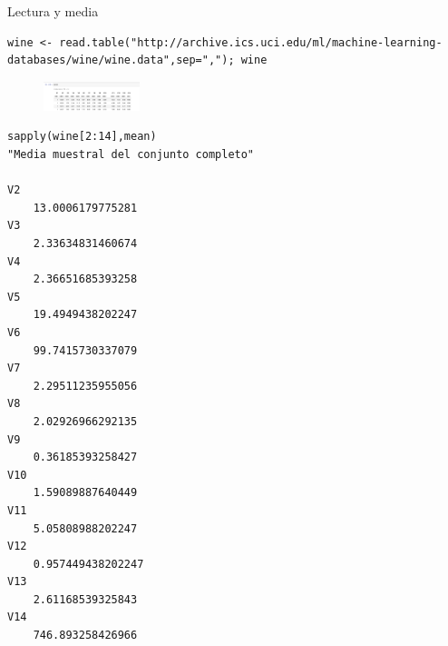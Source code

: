 \documentclass[xcolor=table]{beamer}
\begin{document}
\begin{frame}{Lectura y media}
\begin{lstlisting}
wine <- read.table("http://archive.ics.uci.edu/ml/machine-learning-databases/wine/wine.data",sep=","); wine
\end{lstlisting}
\begin{figure}
\centering
\includegraphics[width=0.25\textwidth]{dataframe_wine.png}
\end{figure}
\begin{lstlisting}
sapply(wine[2:14],mean)
"Media muestral del conjunto completo"

V2
    13.0006179775281
V3
    2.33634831460674
V4
    2.36651685393258
V5
    19.4949438202247
V6
    99.7415730337079
V7
    2.29511235955056
V8
    2.02926966292135
V9
    0.36185393258427
V10
    1.59089887640449
V11
    5.05808988202247
V12
    0.957449438202247
V13
    2.61168539325843
V14
    746.893258426966
    
\end{lstlisting}

\end{frame}
\end{document}
